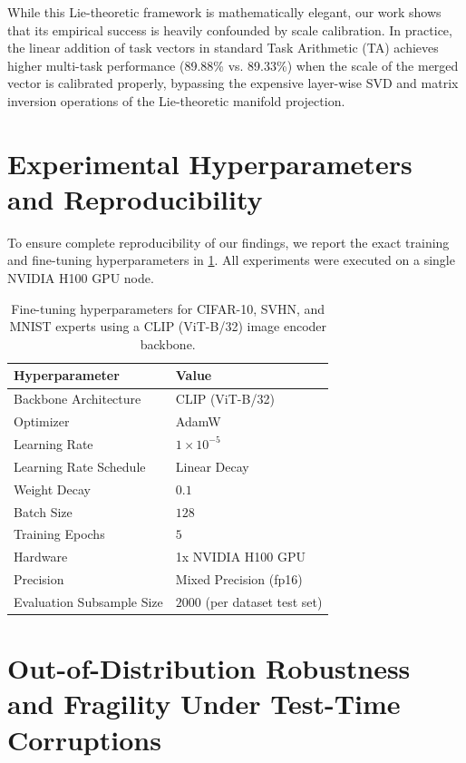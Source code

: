\documentclass{article}
\begin{document}
While this Lie-theoretic framework is mathematically elegant, our work shows that its empirical success is heavily confounded by scale calibration. In practice, the linear addition of task vectors in standard Task Arithmetic (TA) achieves higher multi-task performance (89.88\% vs. 89.33\%) when the scale of the merged vector is calibrated properly, bypassing the expensive layer-wise SVD and matrix inversion operations of the Lie-theoretic manifold projection.

\section{Experimental Hyperparameters and Reproducibility}
\label{app:hyperparameters}

To ensure complete reproducibility of our findings, we report the exact training and fine-tuning hyperparameters in \cref{tab:hyperparameters}. All experiments were executed on a single NVIDIA H100 GPU node.

\begin{table}[h]
\caption{Fine-tuning hyperparameters for CIFAR-10, SVHN, and MNIST experts using a CLIP (ViT-B/32) image encoder backbone.}
\label{tab:hyperparameters}
\vskip 0.15in
\begin{center}
\begin{small}
\begin{tabular}{ll}
\toprule
Hyperparameter & Value \\
\midrule
Backbone Architecture & CLIP (ViT-B/32) \\
Optimizer & AdamW \\
Learning Rate & $1\times 10^{-5}$ \\
Learning Rate Schedule & Linear Decay \\
Weight Decay & $0.1$ \\
Batch Size & $128$ \\
Training Epochs & $5$ \\
Hardware & 1x NVIDIA H100 GPU \\
Precision & Mixed Precision (fp16) \\
Evaluation Subsample Size & $2000$ (per dataset test set) \\
\bottomrule
\end{tabular}
\end{small}
\end{center}
\vskip -0.1in
\end{table}

\section{Out-of-Distribution Robustness and Fragility Under Test-Time Corruptions}
\label{app:ood_robustness}
\end{document}

